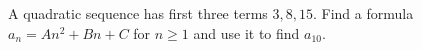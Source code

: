 A quadratic sequence has first three terms $3,8,15$. Find a formula $a_n=An^2+Bn+C$ for $n\ge1$ and use it to find $a_{10}$.
